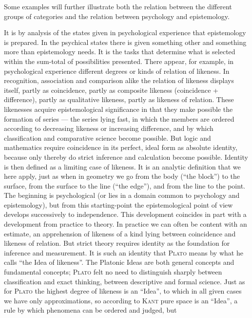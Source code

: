 \documentclass[12pt]{book}
\newcommand{\opage}[1]{\marginnote{\footnotesize\textit{[#1]}}}
\begin{document}
Some examples will further illustrate both the relation between the different
groups of categories and the relation between psychology and epistemology.

It is by analysis of the states given in psychological experience that
\opage{16}epistemology is prepared. In the psychical states there is given something other
and something more than epistemology needs. It is the tasks that determine what
is selected within the sum-total of possibilities presented. There appear, for
example, in psychological experience different degrees or kinds of relation of
likeness. In recognition, association and comparison alike the relation of
likeness displays itself, partly as coincidence, partly as composite likeness
(coincidence + difference), partly as qualitative likeness, partly as likeness
of relation. These likenesses acquire epistemological significance in that they
make possible the formation of series --- the series lying fast, in which the
members are ordered according to decreasing likeness or increasing difference,
and by which classification and comparative science become possible. But logic
and mathematics require coincidence in its perfect, ideal form as absolute
identity, because only thereby do strict inference and calculation become
possible. Identity is then defined as a limiting case of likeness. It is an
analytic definition that we here apply, just as when in geometry we go from the
body (``the block'') to the surface, from the surface to the line (``the
edge''), and from the line to the point. The beginning is psychological (or lies
in a domain common to psychology and epistemology), but from this starting-point
the epistemological point of view develops successively to independence. This
development coincides in part with a development from practice to theory. In
practice we can often be content with an estimate, an apprehension of likeness
of a kind lying between coincidence and likeness of relation. But strict theory
requires identity as the foundation for inference and measurement. It is such an
identity that \textsc{Plato} means by what he calls ``the Idea of likeness''.
The Platonic Ideas are both general concepts and fundamental concepts;
\textsc{Plato} felt no need to distinguish sharply between classification and
exact thinking, between descriptive and formal science. Just as for
\textsc{Plato} the highest degree of likeness is an ``Idea'', to which in all
given cases we have only approximations, so according to \textsc{Kant} pure
space is an ``Idea'', a rule by which phenomena can be ordered and judged, but
\end{document}
